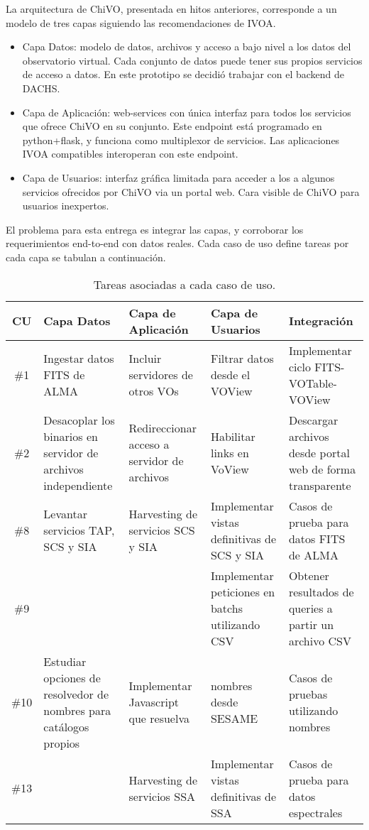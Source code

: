 La arquitectura de ChiVO, presentada en hitos anteriores, corresponde
a un modelo de tres capas siguiendo las recomendaciones de IVOA.

\begin{itemize}
\item Capa Datos: modelo de datos, archivos y acceso a bajo nivel 
a los datos del observatorio virtual. Cada conjunto de datos puede
tener sus propios servicios de acceso a datos. En este prototipo
se decidió trabajar con el backend de DACHS.
\item Capa de Aplicación: web-services con única interfaz para todos
los servicios que ofrece ChiVO en su conjunto. Este endpoint está programado en
python+flask, y funciona como multiplexor de servicios. Las aplicaciones
IVOA compatibles interoperan con este endpoint.
\item Capa de Usuarios: interfaz gráfica limitada para acceder a los
a algunos servicios ofrecidos por ChiVO via un portal web. Cara visible
de ChiVO para usuarios inexpertos.
\end{itemize}

El problema para esta entrega es integrar las capas, y corroborar
los requerimientos end-to-end con datos reales. Cada caso de uso
define tareas por cada capa se tabulan a continuación.

\begin{table}[ht!]
    \begin{center}
	\begin{tabular}{c|p{1.2in}|p{1.4in}|p{1.3in}|p{1.3in}}
	    \textbf{CU} & \textbf{Capa Datos} &
	    \textbf{Capa de Aplicación} & \textbf{Capa de Usuarios} &
	    \textbf{Integración} \\\hline\hline
	    \#1 & 
	    Ingestar datos FITS de ALMA & Incluir servidores de otros
	    VOs & Filtrar datos desde el VOView & Implementar ciclo
	    FITS-VOTable-VOView \\\hline
	    \#2 & Desacoplar los binarios en servidor de archivos
	    independiente & Redireccionar acceso a servidor de
	    archivos & Habilitar links en VoView & Descargar archivos
	    desde portal web de forma transparente \\\hline
	    \#8 & Levantar servicios TAP, SCS y SIA & Harvesting de
	    servicios SCS y SIA & Implementar vistas definitivas de
	    SCS y SIA & Casos de prueba para datos FITS de ALMA \\\hline
	    \#9 & & & Implementar peticiones en batchs utilizando CSV &
	    Obtener resultados de queries a partir un archivo CSV
	    \\\hline 
	    \#10 &
	    Estudiar opciones de resolvedor de nombres para catálogos
	    propios & Implementar Javascript que resuelva & nombres
	    desde SESAME & Casos de pruebas utilizando nombres \\\hline
	    \#13 & & 
	    Harvesting de servicios SSA & Implementar vistas
	    definitivas de SSA & Casos de prueba para datos
	    espectrales \\
	\end{tabular}
    \end{center}
    \caption{Tareas asociadas a cada caso de uso.}
\end{table}



